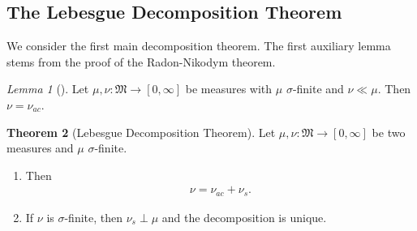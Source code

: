 \documentclass[10pt, leqno]{amsart}
\theoremstyle{definition}
\newtheorem{theorem}{Theorem}[section]
\theoremstyle{remark}
\newtheorem{lemma}[theorem]{Lemma}
\begin{document}
    \subsection{The Lebesgue Decomposition Theorem} We consider the first main decomposition theorem. The first auxiliary lemma stems from the proof of the Radon-Nikodym theorem.

    \begin{edgebox}
        \begin{lemma}[{\cite[p. 56, 64]{Fonseca}}] \label{lem:radon_nikodym_remark}
            Let \(\mu, \nu\colon \mathfrak{M} \to [0, \infty]\) be measures with \(\mu\) \(\sigma\)-finite and \(\nu \ll \mu\). Then \(\nu = \nu_{ac}\).
        \end{lemma}
    \end{edgebox}

    \begin{theorem}[Lebesgue Decomposition Theorem] \label{thm:lebesgue_decomposition_theorem}
        Let \(\mu, \nu\colon \mathfrak{M} \to [0, \infty]\) be two measures and \(\mu\) \(\sigma\)-finite.
        \begin{enumerate}[label=(\roman*), wide]
            \item \label{thm:lebesgue_decomposition_theorem_1} Then
            \begin{align}
                \nu = \nu_{ac} + \nu_s.
            \end{align}
            \item \label{thm:lebesgue_decomposition_theorem_2} If \(\nu\) is \(\sigma\)-finite, then \(\nu_s \perp \mu\) and the decomposition is unique.
        \end{enumerate}
    \end{theorem}
\end{document}

